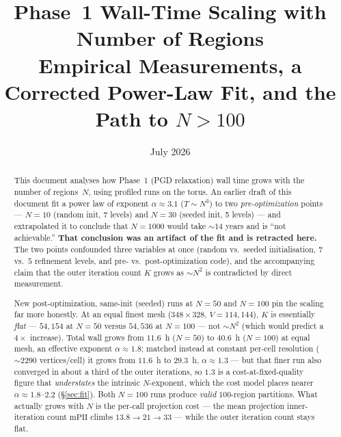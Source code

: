 \documentclass[11pt,a4paper]{article}
\title{\textbf{Phase~1 Wall-Time Scaling with Number of Regions}\\[0.5em]
  \large Empirical Measurements, a Corrected Power-Law Fit, and the Path to $N>100$}
\author{}
\date{July 2026}
\begin{document}
\maketitle

\begin{abstract}
This document analyses how Phase~1 (PGD relaxation) wall time grows with the
number of regions~$N$, using profiled runs on the torus.  An earlier draft of
this document fit a power law of exponent $\alpha \approx 3.1$ ($T \sim N^3$)
to two \emph{pre-optimization} points --- $N=10$ (random init, 7 levels) and
$N=30$ (seeded init, 5 levels) --- and extrapolated it to conclude that
$N=1000$ would take $\sim\!14$ years and is ``not achievable.''  \textbf{That
conclusion was an artifact of the fit and is retracted here.}  The two points
confounded three variables at once (random vs.\ seeded initialisation, $7$
vs.\ $5$ refinement levels, and pre- vs.\ post-optimization code), and the
accompanying claim that the outer iteration count $K$ grows as $\sim\!N^2$ is
contradicted by direct measurement.

New post-optimization, same-init (seeded) runs at $N=50$ and $N=100$ pin the
scaling far more honestly.  At an equal finest mesh
($348\times328$, $V=114{,}144$), $K$ is essentially \emph{flat} ---
$54{,}154$ at $N=50$ versus $54{,}536$ at $N=100$ --- not $\sim\!N^2$ (which
would predict a $4\times$ increase).  Total wall grows from
$\mathbf{11.6}$~h ($N=50$) to $\mathbf{40.6}$~h ($N=100$) at equal mesh, an
effective exponent $\alpha\approx1.8$; matched instead at constant per-cell
resolution ($\sim\!2290$ vertices/cell) it grows from $11.6$~h to
$\mathbf{29.3}$~h, $\alpha\approx1.3$ --- but that finer run also converged in
about a third of the outer iterations, so $1.3$ is a cost-at-fixed-quality
figure that \emph{understates} the intrinsic $N$-exponent, which the cost model
places nearer $\alpha\approx1.8$--$2.2$ (\S\ref{sec:fit}).  Both $N=100$ runs
produce \emph{valid} $100$-region partitions.  What actually grows with $N$ is the
per-call projection cost --- the mean projection inner-iteration count
$\mathrm{mPII}$ climbs $13.8\to21\to33$ --- while the outer iteration count
stays flat.


\end{abstract}
\end{document}
